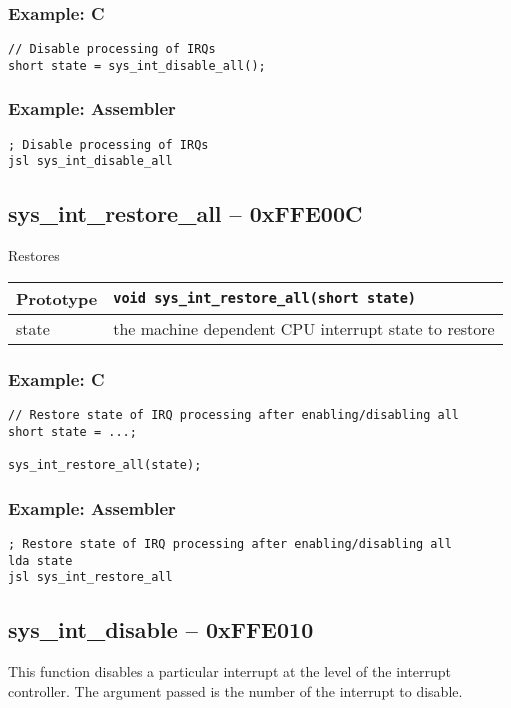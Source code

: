 \subsubsection*{Example: C}
\begin{lstlisting}
// Disable processing of IRQs
short state = sys_int_disable_all();
\end{lstlisting}

\subsubsection*{Example: Assembler}
\begin{verbatim}
; Disable processing of IRQs
jsl sys_int_disable_all
\end{verbatim}


\subsection*{sys\_int\_restore\_all -- 0xFFE00C}
Restores 

\bigskip

\begin{tabular}{|l||l|} \hline
Prototype & \lstinline!void sys_int_restore_all(short state)! \\ \hline
state & the machine dependent CPU interrupt state to restore
\end{tabular}

\subsubsection*{Example: C}
\begin{lstlisting}
// Restore state of IRQ processing after enabling/disabling all
short state = ...;

sys_int_restore_all(state);
\end{lstlisting}

\subsubsection*{Example: Assembler}
\begin{verbatim}
; Restore state of IRQ processing after enabling/disabling all
lda state
jsl sys_int_restore_all
\end{verbatim}

\subsection*{sys\_int\_disable -- 0xFFE010}
This function disables a particular interrupt at the level of the interrupt controller. The argument passed is the number of the interrupt to disable.

